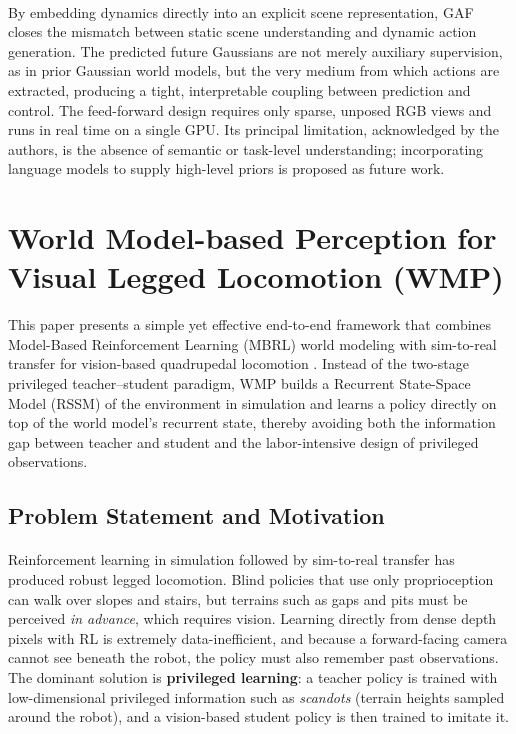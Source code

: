 \documentclass[12pt,a4paper,final]{extreport}
\begin{document}
\paragraph{}
By embedding dynamics directly into an explicit scene representation, GAF closes the mismatch between static scene understanding and dynamic action generation. The predicted future Gaussians are not merely auxiliary supervision, as in prior Gaussian world models, but the very medium from which actions are extracted, producing a tight, interpretable coupling between prediction and control. The feed-forward design requires only sparse, unposed RGB views and runs in real time on a single GPU. Its principal limitation, acknowledged by the authors, is the absence of semantic or task-level understanding; incorporating language models to supply high-level priors is proposed as future work.


\section{World Model-based Perception for Visual Legged Locomotion (WMP)}
This paper presents a simple yet effective end-to-end framework that combines Model-Based Reinforcement Learning (MBRL) world modeling with sim-to-real transfer for vision-based quadrupedal locomotion \cite{p3}. Instead of the two-stage privileged teacher--student paradigm, WMP builds a Recurrent State-Space Model (RSSM) of the environment in simulation and learns a policy directly on top of the world model's recurrent state, thereby avoiding both the information gap between teacher and student and the labor-intensive design of privileged observations.

\subsection{Problem Statement and Motivation}

\paragraph{} Reinforcement learning in simulation followed by sim-to-real transfer has produced robust legged locomotion. Blind policies that use only proprioception can walk over slopes and stairs, but terrains such as gaps and pits must be perceived \emph{in advance}, which requires vision. Learning directly from dense depth pixels with RL is extremely data-inefficient, and because a forward-facing camera cannot see beneath the robot, the policy must also remember past observations. The dominant solution is \textbf{privileged learning}: a teacher policy is trained with low-dimensional privileged information such as \emph{scandots} (terrain heights sampled around the robot), and a vision-based student policy is then trained to imitate it.
\end{document}
